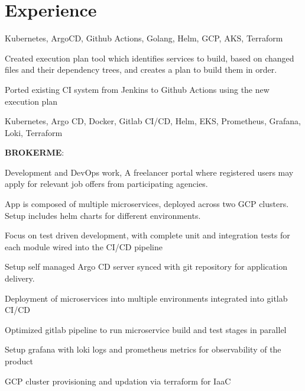 \documentclass[]{font}
\begin{document}
\begin{minipage}[t]{0.66\textwidth} 


\section{Experience}


Kubernetes, ArgoCD, Github Actions, Golang, Helm, GCP, AKS, Terraform
\vspace{\topsep}

\begin{tightemize}
\item Created execution plan tool which identifies services to build, based on changed files and their dependency trees, and creates a plan to build them in order. 
\item Ported existing CI system from Jenkins to Github Actions using the new execution plan 
\end{tightemize}
\sectionsep


Kubernetes, Argo CD, Docker, Gitlab CI/CD, Helm, EKS, Prometheus, Grafana, Loki, Terraform
\vspace{\topsep}

\textbf{BROKERME}:
\vspace{\topsep}

\begin{tightemize}
\item Development and DevOps work, A freelancer portal where registered users may apply for relevant job offers from participating agencies.
\item App is composed of multiple microservices, deployed across two GCP clusters. Setup includes helm charts for different environments.
\item Focus on test driven development, with complete unit and integration tests for each module wired into the CI/CD pipeline
\item Setup self managed Argo CD server synced with git repository for application delivery.
\item Deployment of microservices into multiple environments integrated into gitlab CI/CD
\item Optimized gitlab pipeline to run microservice build and test stages in parallel
\item Setup grafana with loki logs and prometheus metrics for observability of the product
\item GCP cluster provisioning and updation via terraform for IaaC
\end{tightemize}


\end{minipage}
\end{document}
